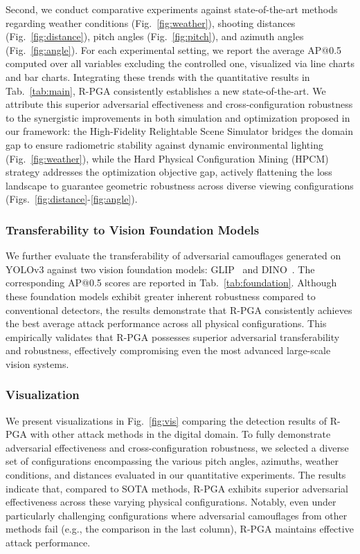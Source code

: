 \documentclass[10pt,journal,compsoc]{IEEEtran}
\begin{document}
Second, we conduct comparative experiments against state-of-the-art methods regarding weather conditions (Fig.~\ref{fig:weather}), shooting distances (Fig.~\ref{fig:distance}), pitch angles (Fig.~\ref{fig:pitch}), and azimuth angles (Fig.~\ref{fig:angle}). 
For each experimental setting, we report the average AP@0.5 computed over all variables excluding the controlled one, visualized via line charts and bar charts. Integrating these trends with the quantitative results in Tab.~\ref{tab:main}, R-PGA consistently establishes a new state-of-the-art. 
We attribute this superior adversarial effectiveness and cross-configuration robustness to the synergistic improvements in both simulation and optimization proposed in our framework: the High-Fidelity Relightable Scene Simulator bridges the domain gap to ensure radiometric stability against dynamic environmental lighting (Fig.~\ref{fig:weather}), while the Hard Physical Configuration Mining (HPCM) strategy addresses the optimization objective gap, actively flattening the loss landscape to guarantee geometric robustness across diverse viewing configurations (Figs.~\ref{fig:distance}-\ref{fig:angle}).



\subsubsection{Transferability to Vision Foundation Models}
We further evaluate the transferability of adversarial camouflages generated on YOLOv3 against two vision foundation models: GLIP~\cite{li2022glip} and DINO~\cite{zhang2022dino}. 
The corresponding AP@0.5 scores are reported in Tab.~\ref{tab:foundation}. 
Although these foundation models exhibit greater inherent robustness compared to conventional detectors, the results demonstrate that R-PGA consistently achieves the best average attack performance across all physical configurations. 
This empirically validates that R-PGA possesses superior adversarial transferability and robustness, effectively compromising even the most advanced large-scale vision systems.




\subsubsection{Visualization}



We present visualizations in Fig.~\ref{fig:vis} comparing the detection results of R-PGA with other attack methods in the digital domain. 
To fully demonstrate adversarial effectiveness and cross-configuration robustness, we selected a diverse set of configurations encompassing the various pitch angles, azimuths, weather conditions, and distances evaluated in our quantitative experiments. 
The results indicate that, compared to SOTA methods, R-PGA exhibits superior adversarial effectiveness across these varying physical configurations. 
Notably, even under particularly challenging configurations where adversarial camouflages from other methods fail (e.g., the comparison in the last column), R-PGA maintains effective attack performance.
\end{document}
